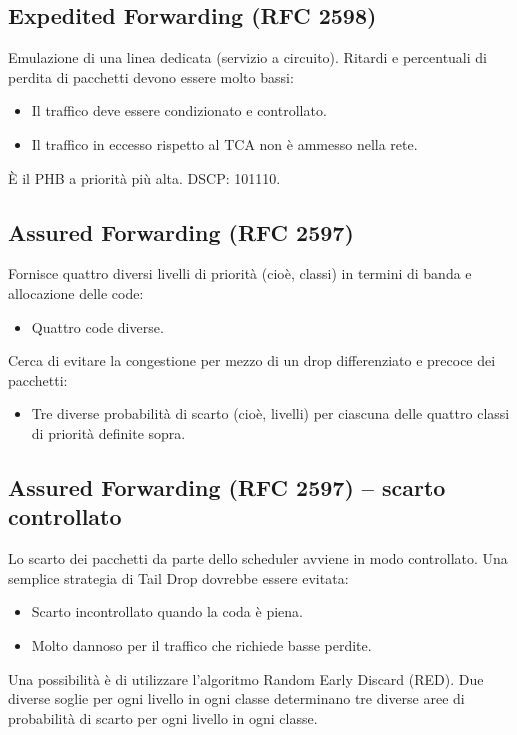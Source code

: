 \subsection{Expedited Forwarding (RFC 2598)}
Emulazione di una linea dedicata (servizio a circuito). Ritardi e percentuali di perdita di pacchetti devono essere molto bassi:
\begin{itemize}
	\item Il traffico deve essere condizionato e controllato.
	\item Il traffico in eccesso rispetto al TCA non è ammesso nella rete.
\end{itemize}

È il PHB a priorità più alta. DSCP: 101110.

\subsection{Assured Forwarding (RFC 2597)}
Fornisce quattro diversi livelli di priorità (cioè, classi) in termini di banda e allocazione delle code:
\begin{itemize}
	\item Quattro code diverse.
\end{itemize}

Cerca di evitare la congestione per mezzo di un drop differenziato e precoce dei pacchetti:
\begin{itemize}
	\item Tre diverse probabilità di scarto (cioè, livelli) per ciascuna delle quattro classi di priorità definite sopra.
\end{itemize}

\subsection{Assured Forwarding (RFC 2597) – scarto controllato}
Lo scarto dei pacchetti da parte dello scheduler avviene in modo controllato. Una semplice strategia di Tail Drop dovrebbe essere evitata:
\begin{itemize}
	\item Scarto incontrollato quando la coda è piena.
	\item Molto dannoso per il traffico che richiede basse perdite.
\end{itemize}

Una possibilità è di utilizzare l'algoritmo Random Early Discard (RED). Due diverse soglie per ogni livello in ogni classe determinano tre diverse aree di probabilità di scarto per ogni livello in ogni classe.

